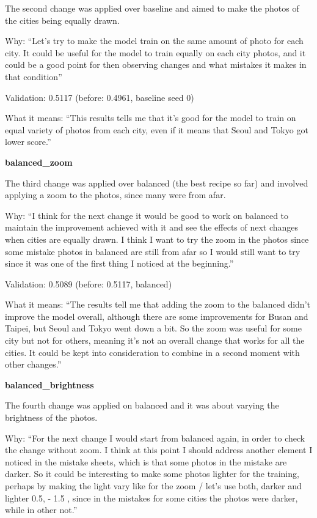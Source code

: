\documentclass[11pt]{article}
\begin{document}
{The second change was applied over baseline and aimed to make the photos of the cities being equally drawn.\par
Why: ``Let's try to make the model train on the same amount of photo for each city. It could be useful for the model to train equally on each city photos, and it could be a good point for then observing changes and what mistakes it makes in that condition''\par
Validation: 0.5117 (before: 0.4961, baseline seed 0)\par
What it means: ``This results tells me that it's good for the model to train on equal variety of photos from each city, even if it means that Seoul and Tokyo got lower score.''
\par\medskip\noindent\textbf{balanced\_zoom}\par
The third change was applied over balanced (the best recipe so far) and involved applying a zoom to the photos, since many were from afar.\par
Why: ``I think for the next change it would be good to work on balanced to maintain the improvement achieved with it and see the effects of next changes when cities are equally drawn. I think I want to try the zoom in the photos since some mistake photos in balanced are still from afar so I would still want to try since it was one of the first thing I noticed at the beginning.''\par
Validation: 0.5089 (before: 0.5117, balanced)\par
What it means: ``The results tell me that adding the zoom to the balanced didn't improve the model overall, although there are some improvements for Busan and Taipei, but Seoul and Tokyo went down a bit. So the zoom was useful for some city but not for others, meaning it's not an overall change that works for all the cities. It could be kept into consideration to combine in a second moment with other changes.''
\par\medskip\noindent\textbf{balanced\_brightness}\par
The fourth change was applied on balanced and it was about varying the brightness of the photos.\par
Why: ``For the next change I would start from balanced again, in order to check the change without zoom. I think at this point I should address another element I noticed in the mistake sheets, which is that some photos in the mistake are darker. So it could be interesting to make some photos lighter for the training, perhaps by making the light vary like for the zoom / let's use both, darker and lighter 0.5, - 1.5 , since in the mistakes for some cities the photos were darker, while in other not.''\par
}
\end{document}
